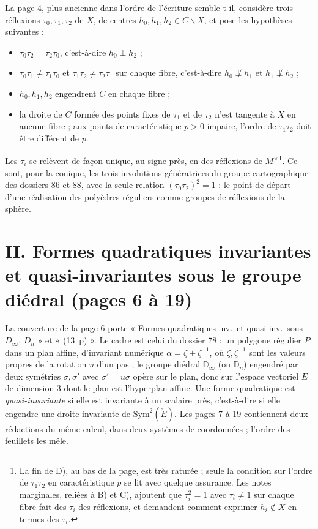 \documentclass[11pt,a4paper]{article}
\begin{document}
La page 4, plus ancienne dans l'ordre de l'écriture semble-t-il, considère
trois réflexions $\tau_0, \tau_1, \tau_2$ de $X$, de centres $h_0, h_1, h_2 \in C
\smallsetminus X$, et pose les hypothèses suivantes :
\begin{itemize}
  \item[A)] $\tau_0 \tau_2 = \tau_2 \tau_0$, c'est-à-dire $h_0 \perp h_2$ ;
  \item[B)] $\tau_0\tau_1 \neq \tau_1\tau_0$ et $\tau_1\tau_2 \neq \tau_2\tau_1$ sur
    chaque fibre, c'est-à-dire $h_0 \not\perp h_1$ et $h_1 \not\perp h_2$ ;
  \item[C)] $h_0, h_1, h_2$ engendrent $C$ en chaque fibre ;
  \item[D)] la droite de $C$ formée des points fixes de $\tau_1$ et de $\tau_2$
    n'est tangente à $X$ en aucune fibre ; aux points de caractéristique
    $p > 0$ impaire, l'ordre de $\tau_1\tau_2$ doit être différent de $p$.
\end{itemize}
Les $\tau_i$ se relèvent de façon unique, au signe près, en des réflexions de
$M^{\times}$\footnote{La fin de D), au bas de la page, est très raturée ; seule
la condition sur l'ordre de $\tau_1\tau_2$ en caractéristique $p$ se lit avec
quelque assurance. Les notes marginales, reliées à B) et C), ajoutent que
$\tau_i^2 = 1$ avec $\tau_i \neq 1$ sur chaque fibre fait des $\tau_i$ des
réflexions, et demandent comment exprimer $h_i \notin X$ en termes des
$\tau_i$.}. Ce sont, pour la conique, les trois involutions génératrices du
groupe cartographique des dossiers 86 et 88, avec la seule relation
$(\tau_0\tau_2)^2 = 1$ : le point de départ d'une réalisation des polyèdres
réguliers comme groupes de réflexions de la sphère.

\section*{II. Formes quadratiques invariantes et quasi-invariantes sous le groupe diédral (pages 6 à 19)}

La couverture de la page 6 porte « Formes quadratiques inv.\ et quasi-inv.\ sous
$D_\infty$, $D_n$ » et « (13~p) ». Le cadre est celui du dossier 78 : un polygone
régulier $P$ dans un plan affine, d'invariant numérique $\alpha = \zeta +
\zeta^{-1}$, où $\zeta, \zeta^{-1}$ sont les valeurs propres de la rotation $u$
d'un pas ; le groupe diédral $\mathbb{D}_\infty$ (ou $\mathbb{D}_n$) engendré par
deux symétries $\sigma, \sigma'$ avec $\sigma' = u\sigma$ opère sur le plan, donc
sur l'espace vectoriel $E$ de dimension $3$ dont le plan est l'hyperplan
affine. Une forme quadratique est \emph{quasi-invariante} si elle est invariante
à un scalaire près, c'est-à-dire si elle engendre une droite invariante de
$\mathrm{Sym}^2(\check{E})$. Les pages 7 à 19 contiennent deux rédactions du même
calcul, dans deux systèmes de coordonnées ; l'ordre des feuillets les mêle.
\end{document}
